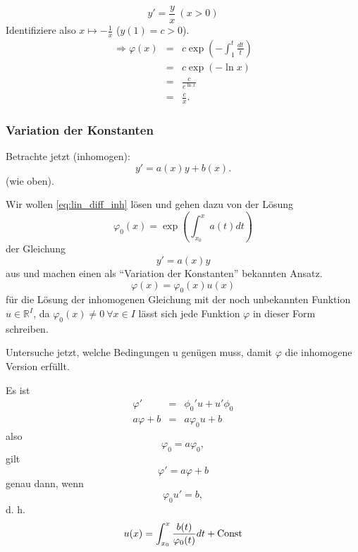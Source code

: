 \documentclass[10pt]{scrbook}
\begin{document}
\begin{Bsp}
\begin{displaymath}
y' = \frac{y}{x}\ (x>0)
\end{displaymath}
Identifiziere also $x\mapsto -\frac{1}{x}$ ($y(1)=c>0$).
\begin{eqnarray*}
\Rightarrow \varphi(x) & = & c \exp(-\int_{1}^t \frac{dt}{t}) \\
 & = & c \exp(-\ln x) \\
 & = & \frac{c}{e^{\ln x}} \\
 & = & \frac{c}{x}.
\end{eqnarray*}
\end{Bsp}

\subsubsection{Variation der Konstanten}

Betrachte jetzt (inhomogen):
\begin{equation}
y'=a(x) y +b(x). \label{eq:lin_diff_inh}
\end{equation}
(wie oben).

Wir wollen \eqref{eq:lin_diff_inh} lösen und gehen dazu von der Lösung
\begin{displaymath}
\varphi_0(x)=\exp(\int_{x_0}^x a(t) dt)
\end{displaymath}
der Gleichung
\begin{displaymath}
y'=a(x)y \label{eq:diff_h}
\end{displaymath}
aus und machen einen als "`Variation der Konstanten"' bekannten Ansatz.
\begin{displaymath}
\varphi(x) = \varphi_0(x) u(x)
\end{displaymath}
für die Lösung der inhomogenen Gleichung mit der noch unbekannten Funktion $u\in \mathbb{R}^I$, da $\varphi_0(x)\neq 0\ \forall x\in I$ lässt sich jede Funktion $\varphi$ in dieser Form schreiben.

Untersuche jetzt, welche Bedingungen u genügen muss, damit $\varphi$ die inhomogene Version erfüllt. 

Es ist 
\begin{eqnarray*}
\varphi' & = & \phi_0' u+u' \phi_0 \\
a \varphi + b & = & a \varphi_0 u+b
\end{eqnarray*}
also
\begin{displaymath}
\varphi_0=a\varphi_0,
\end{displaymath}
gilt
\begin{displaymath}
\varphi'=a\varphi+b
\end{displaymath}
genau dann, wenn
\begin{displaymath}
\varphi_0 u' = b,
\end{displaymath}
d. h.
\begin{displaymath}
u(x) = \int_{x_0}^x \frac{b(t)}{\varphi_0(t)} dt+\textnormal{Const}
\end{displaymath}
\end{document}
